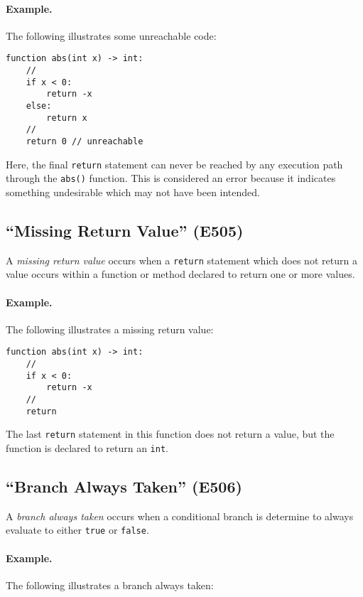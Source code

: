 \paragraph{Example.} The following illustrates some unreachable code:

\begin{lstlisting}
function abs(int x) -> int:
    //
    if x < 0:
        return -x
    else:
        return x
    //
    return 0 // unreachable
\end{lstlisting}

Here, the final \lstinline{return} statement can never be reached by any execution path through the \lstinline{abs()} function.  This is considered an error because it indicates something undesirable which may not have been intended.

\subsection{``Missing Return Value'' (E505)}

A {\em missing return value} occurs when a \lstinline{return} statement which does not return a value occurs within a function or method declared to return one or more values.  

\paragraph{Example.} The following illustrates a missing return value:

\begin{lstlisting}
function abs(int x) -> int:
    //
    if x < 0:
        return -x
    //
    return
\end{lstlisting}

The last \lstinline{return} statement in this function does not return a value, but the function is declared to return an \lstinline{int}.

\subsection{``Branch Always Taken'' (E506)}

A {\em branch always taken} occurs when a conditional branch is determine to always evaluate to either \lstinline{true} or \lstinline{false}.  

\paragraph{Example.} The following illustrates a branch always taken:

